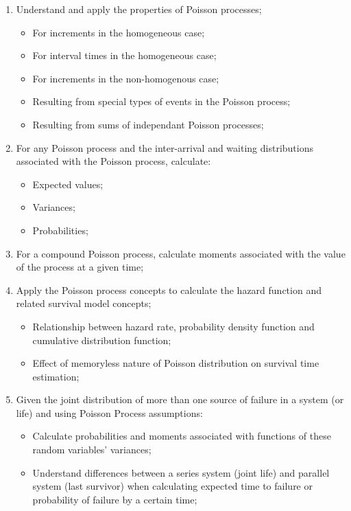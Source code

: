 \documentclass[12pt, titlepage, french]{report}
\begin{document}
\begin{outcomes}
\begin{enumerate}
	\item	Understand and apply the properties of Poisson processes;
		\begin{itemize}
		\item	For increments in the homogeneous case;
		\item	For interval times in the homogeneous case;
		\item	For increments in the non-homogenous case;
		\item	Resulting from special types of events in the Poisson process;
		\item	Resulting from sums of independant Poisson processes;
		\end{itemize}
\tcbline
	\item	For any Poisson process and the inter-arrival and waiting distributions associated with the Poisson process, calculate:
		\begin{itemize}
		\item	Expected values;
		\item	Variances;
		\item	Probabilities;
		\end{itemize}
\tcbline
	\item	For a compound Poisson process, calculate moments associated with the value of the process at a given time;
\tcbline
	\item	Apply the Poisson process concepts to calculate the hazard function and related survival model concepts;
		\begin{itemize}
		\item	Relationship between hazard rate, probability density function and cumulative distribution function;
		\item	Effect of memoryless nature of Poisson distribution on survival time estimation;
		\end{itemize}
\tcbline
	\item	Given the joint distribution of more than one source of failure in a system (or life) and using Poisson Process assumptions:
		\begin{itemize}
		\item	Calculate probabilities and moments associated with functions of these random variables' variances;
		\item	Understand differences between a series system (joint life) and parallel system (last survivor) when calculating expected time to failure or probability of failure by a certain time;

\end{itemize}
\end{enumerate}
\end{outcomes}
\end{document}
